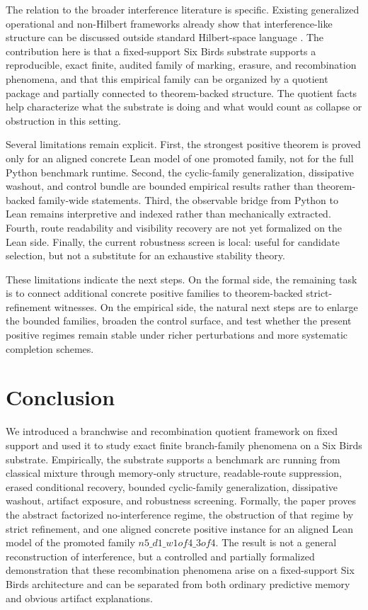 \documentclass[11pt]{article}
\theoremstyle{definition}
\begin{document}
The relation to the broader interference literature is specific. Existing generalized operational and non-Hilbert frameworks already show that interference-like structure can be discussed outside standard Hilbert-space language \cite{Sorkin1994QuantumMeasure,Barrett2007GPT,BarnumMuellerUdudec2014HigherOrder,LeeSelby2017HigherOrder,DakicPaterekBrukner2014DensityCubes,GarnerEtAl2013PhaseInterference,Plavala2023GPTIntro,ChiribellaDarianoPerinotti2011InformationalDerivation}. The contribution here is that a fixed-support Six Birds substrate supports a reproducible, exact finite, audited family of marking, erasure, and recombination phenomena, and that this empirical family can be organized by a quotient package and partially connected to theorem-backed structure. The quotient facts help characterize what the substrate is doing and what would count as collapse or obstruction in this setting.

Several limitations remain explicit. First, the strongest positive theorem is proved only for an aligned concrete Lean model of one promoted family, not for the full Python benchmark runtime. Second, the cyclic-family generalization, dissipative washout, and control bundle are bounded empirical results rather than theorem-backed family-wide statements. Third, the observable bridge from Python to Lean remains interpretive and indexed rather than mechanically extracted. Fourth, route readability and visibility recovery are not yet formalized on the Lean side. Finally, the current robustness screen is local: useful for candidate selection, but not a substitute for an exhaustive stability theory.

These limitations indicate the next steps. On the formal side, the remaining task is to connect additional concrete positive families to theorem-backed strict-refinement witnesses. On the empirical side, the natural next steps are to enlarge the bounded families, broaden the control surface, and test whether the present positive regimes remain stable under richer perturbations and more systematic completion schemes.

\section{Conclusion}

We introduced a branchwise and recombination quotient framework on fixed support and used it to study exact finite branch-family phenomena on a Six Birds substrate. Empirically, the substrate supports a benchmark arc running from classical mixture through memory-only structure, readable-route suppression, erased conditional recovery, bounded cyclic-family generalization, dissipative washout, artifact exposure, and robustness screening. Formally, the paper proves the abstract factorized no-interference regime, the obstruction of that regime by strict refinement, and one aligned concrete positive instance for an aligned Lean model of the promoted family \(n5\_d1\_w1of4\_3of4\). The result is not a general reconstruction of interference, but a controlled and partially formalized demonstration that these recombination phenomena arise on a fixed-support Six Birds architecture and can be separated from both ordinary predictive memory and obvious artifact explanations.
\end{document}
